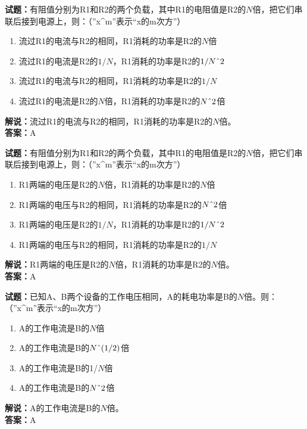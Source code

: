 \documentclass{ctexbook}
\begin{document}
\vspace{1em}

\textbf{试题：}有阻值分别为R1和R2的两个负载，其中R1的电阻值是R2的\(N\)倍，把它们串联后接到电源上，则：（”x\string^m”表示“x的m次方”）
\begin{enumerate}[leftmargin=3em]
  \item 流过R1的电流与R2的相同，R1消耗的功率是R2的\(N\)倍
  \item 流过R1的电流是R2的\(1/N\)，R1消耗的功率是R2的\(1/N\string^2\)
  \item 流过R1的电流与R2的相同，R1消耗的功率是R2的\(1/N\)
  \item 流过R1的电流是R2的\(N\)倍，R1消耗的功率是R2的\(N\string^2\)倍
\end{enumerate}
\noindent\textbf{解说：}流过R1的电流与R2的相同，R1消耗的功率是R2的\(N\)倍。\\
\noindent\textbf{答案：}A

\vspace{1em}

\textbf{试题：}有阻值分别为R1和R2的两个负载，其中R1的电阻值是R2的\(N\)倍，把它们串联后接到电源上，则：（”x\string^m”表示“x的m次方”）
\begin{enumerate}[leftmargin=3em]
  \item R1两端的电压是R2的\(N\)倍，R1消耗的功率是R2的\(N\)倍
  \item R1两端的电压与R2的相同，R1消耗的功率是R2的\(N\string^2\)倍
  \item R1两端的电压是R2的\(1/N\)，R1消耗的功率是R2的\(1/N\string^2\)
  \item R1两端的电压与R2的相同，R1消耗的功率是R2的\(1/N\)
\end{enumerate}
\noindent\textbf{解说：}R1两端的电压是R2的\(N\)倍，R1消耗的功率是R2的\(N\)倍。\\
\noindent\textbf{答案：}A

\vspace{1em}

\textbf{试题：}已知A、B两个设备的工作电压相同，A的耗电功率是B的\(N\)倍。则：（”x\string^m”表示“x的m次方”）
\begin{enumerate}[leftmargin=3em]
  \item A的工作电流是B的\(N\)倍
  \item A的工作电流是B的\(N\string^(1/2)\)倍
  \item A的工作电流是B的1/\(N\)倍
  \item A的工作电流是B的\(N\string^2\)倍
\end{enumerate}
\noindent\textbf{解说：}A的工作电流是B的\(N\)倍。\\
\noindent\textbf{答案：}A
\end{document}
